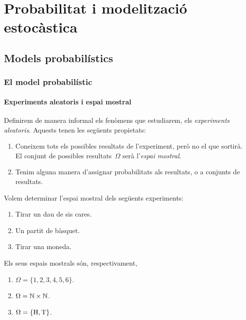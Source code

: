 \documentclass[../Apunts.tex]{subfiles}
\begin{document}
\part{Probabilitat i modelització estocàstica}
\chapter{Models probabilístics}
\section{El model probabilístic}
\subsection{Experiments aleatoris i espai mostral}
	\begin{definition}
		\label{def:experiment aleatori}
		\label{def:espai mostral}
		Definirem de manera informal els fenòmens que estudiarem, els \emph{experiments aleatoris}. Aquests tenen les següents propietats:
		\begin{enumerate}
			\item Coneixem tots els possibles resultats de l'experiment, però no el que sortirà. El conjunt de possibles resultats~\(\Omega\) serà l'\emph{espai mostral}.
			\item Tenim alguna manera d'assignar probabilitats als resultats, o a conjunts de resultats.
		\end{enumerate}
	\end{definition}
	\begin{example}
		Volem determinar l'espai mostral dels següents experiments:
		\begin{enumerate}
			\item Tirar un dau de sis cares.
			\item Un partit de bàsquet.
			\item Tirar una moneda.
		\end{enumerate}
		\begin{solution}
			Els seus espais mostrals són, respectivament,
			\begin{enumerate}
				\item \(\Omega=\{1,2,3,4,5,6\}\).
				\item \(\Omega=\mathbb{N}\times\mathbb{N}\).
				\item \(\Omega=\{\mathrm{H},\mathrm{T}\}\).\qedhere
			\end{enumerate}
		\end{solution}
	\end{example}
\end{document}
